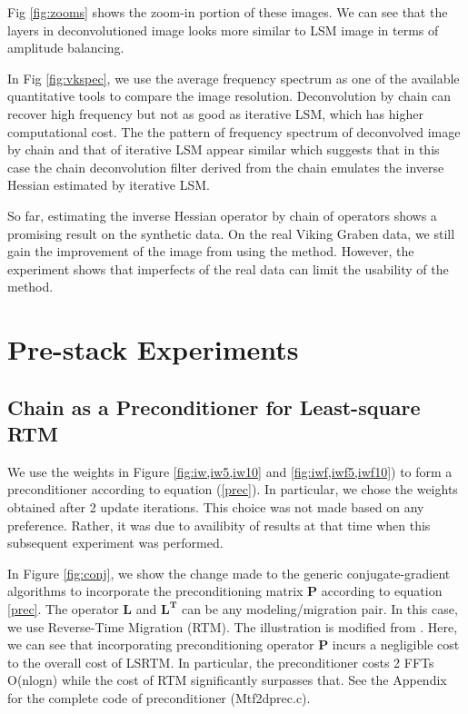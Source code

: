 

Fig \ref{fig:zooms} shows the zoom-in portion of these images. We can see that the layers in deconvolutioned image looks more similar to LSM image in terms of amplitude balancing.


In Fig \ref{fig:vkspec}, we use the average frequency spectrum as one of the available quantitative tools to compare the image resolution. Deconvolution by chain can recover high frequency but not as good as iterative LSM, which has higher computational cost. The the pattern of frequency spectrum of deconvolved image by chain and that of iterative LSM appear similar which suggests that in this case the chain deconvolution filter derived from the chain emulates the inverse Hessian estimated by iterative LSM.


So far, estimating the inverse Hessian operator by chain of operators shows a promising result on the synthetic data. On the real Viking Graben data, we still gain the improvement of the image from using the method. However, the experiment shows that imperfects of the real data can limit the usability of the method.


%
%
\newpage
\section{Pre-stack Experiments}
\subsection{Chain as a Preconditioner for Least-square RTM}

We use the weights in Figure \ref{fig:iw,iw5,iw10} and \ref{fig:iwf,iwf5,iwf10}) to form a preconditioner according to equation (\ref{prec}). In particular, we chose the weights obtained after 2 update iterations. This choice was not made based on any preference. Rather, it was due to availibity of results at that time when this subsequent experiment was performed.

In Figure \ref{fig:conj}, we show the change made to the generic conjugate-gradient algorithms to incorporate the preconditioning matrix $\mathbf{P}$ according to equation \ref{prec}. The operator $\mathbf{L}$ and $\mathbf{L^T}$ can be any modeling/migration pair. In this case, we use Reverse-Time Migration (RTM). The illustration is modified from \cite[]{madagascar}. Here, we can see that incorporating preconditioning operator $\mathbf{P}$ incurs a negligible cost to the overall cost of LSRTM. In particular, the preconditioner costs 2 FFTs O(nlogn) while the cost of RTM significantly surpasses that. See the Appendix for the complete code of preconditioner (Mtf2dprec.c).

